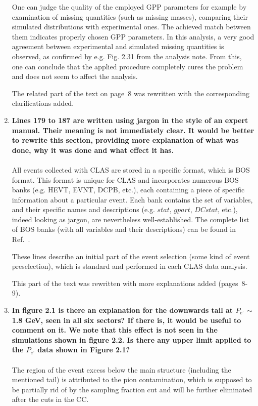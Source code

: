 \documentclass[,superscriptaddress,showpacs,amssymb,amsmath,amsfonts,linenumbers,article]{revtex4-1}
\begin{document}
\begin{enumerate}[label=\textbf{\arabic*}.]
One can judge the quality of the employed GPP parameters for example by examination of missing quantities (such as missing masses), comparing their simulated distributions with experimental ones. The achieved match between them indicates properly chosen GPP parameters. In this analysis, a very good agreement between experimental and simulated missing quantities is observed, as confirmed by e.g. Fig. 2.31 from the analysis note. From this, one can conclude that the applied procedure completely cures the problem and does not seem to affect the analysis.

The related part of the text on page~8 was rewritten with the corresponding clarifications added.


\item {\bf Lines 179 to 187 are written using jargon in the style of an expert manual. Their meaning is not immediately clear.  It would be better to rewrite this section, providing more explanation of what was done, why it was done and what effect it has.} \\ \\
All events collected with CLAS are stored in a specific format, which is BOS format. This format is unique for CLAS and incorporates numerous BOS banks (e.g. HEVT, EVNT, DCPB, etc.), each containing a piece of specific information about a particular event. Each bank contains the set of variables, and their specific names and descriptions (e.g. $stat$, $gpart$, $DCstat$, etc.), indeed looking as jargon, are nevertheless well-established. The complete list of BOS banks (with all variables and their descriptions) can be found in Ref.~\cite{BOS}.

These lines describe an initial part of the event selection (some kind of event preselection), which is standard and performed in each CLAS data analysis. 

This part of the text was rewritten with more explanations added (pages~8-9).


\item {\bf In figure 2.1 is there an explanation for the downwards tail at $P_{e’}$ $\sim$1.8 GeV, seen in all six sectors? If there is, it would be useful to comment on it. We note that this effect is not seen in the simulations shown in figure 2.2. Is there any upper limit applied to the $P_{e’}$ data shown in Figure 2.1?}\\ \\
The region of the event excess below the main structure (including the mentioned tail) is attributed to the pion contamination, which is supposed to be partially rid of by the sampling fraction cut and will be further eliminated after the cuts in the CC. 


\end{enumerate}
\end{document}
